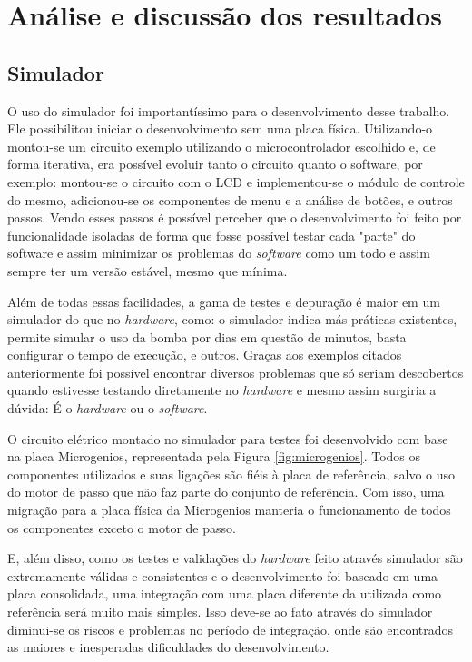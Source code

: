 \chapter{Análise e discussão dos resultados}
\label{cap:resultados}
\section{Simulador}

O uso do simulador foi importantíssimo para o desenvolvimento desse trabalho. Ele possibilitou iniciar o desenvolvimento sem uma placa física. Utilizando-o montou-se um circuito exemplo utilizando o microcontrolador escolhido e, de forma iterativa, era possível evoluir tanto o circuito quanto o software, por exemplo: montou-se o circuito com o LCD e implementou-se o módulo de controle do mesmo, adicionou-se os componentes de menu e a análise de botões, e outros passos. Vendo esses passos é possível perceber que o desenvolvimento foi feito por funcionalidade isoladas de forma que fosse possível testar cada "parte" do software e assim minimizar os problemas do \emph{software} como um todo e assim sempre ter um versão estável, mesmo que mínima.

Além de todas essas facilidades, a gama de testes e depuração é maior em um simulador do que no \emph{hardware}, como: o simulador indica más práticas existentes, permite simular o uso da bomba por dias em questão de minutos, basta configurar o tempo de execução, e outros. Graças aos exemplos citados anteriormente foi possível encontrar diversos problemas que só seriam descobertos quando estivesse testando diretamente no \emph{hardware} e mesmo assim surgiria a dúvida: É o \emph{hardware} ou o \emph{software}.

O circuito elétrico montado no simulador para testes foi desenvolvido com base na placa Microgenios, representada pela Figura \ref{fig:microgenios}. Todos os componentes utilizados e suas ligações são fiéis à placa de referência, salvo o uso do motor de passo que não faz parte do conjunto de referência. Com isso, uma migração para a placa física da Microgenios manteria o funcionamento de todos os componentes exceto o motor de passo.

E, além disso, como os testes e validações do \emph{hardware} feito através simulador são extremamente válidas e consistentes e o desenvolvimento foi baseado em uma placa consolidada, uma integração com uma placa diferente da utilizada como referência será muito mais simples. Isso deve-se ao fato através do simulador diminui-se os riscos e problemas no período de integração, onde são encontrados as maiores e inesperadas dificuldades do desenvolvimento.
 

